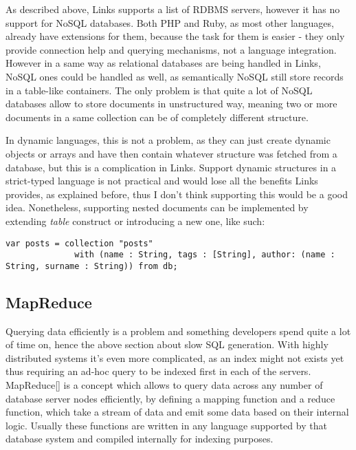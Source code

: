 As described above, Links supports a list of RDBMS servers, however it has no support for NoSQL databases. Both PHP and Ruby, as most other languages, already have extensions for them, because the task for them is easier - they only provide connection help and querying mechanisms, not a language integration. However in a same way as relational databases are being handled in Links, NoSQL ones could be handled as well, as semantically NoSQL still store records in a table-like containers. The only problem is that quite a lot of NoSQL databases allow to store documents in unstructured way, meaning two or more documents in a same collection can be of completely different structure. 

In dynamic languages, this is not a problem, as they can just create dynamic objects or arrays and have then contain whatever structure was fetched from a database, but this is a complication in Links. Support dynamic structures in a strict-typed language is not practical and would lose all the benefits Links provides, as explained before, thus I don't think supporting this would be a good idea. Nonetheless, supporting nested documents can be implemented by extending \textit{table} construct or introducing a new one, like such:

\begin{codelisting}
\begin{verbatim}
var posts = collection "posts" 
			  with (name : String, tags : [String], author: (name : String, surname : String)) from db;
\end{verbatim}
\end{codelisting}

\subsection{MapReduce}

Querying data efficiently is a problem and something developers spend quite a lot of time on, hence the above section about slow SQL generation. With highly distributed systems it's even more complicated, as an index might not exists yet thus requiring an ad-hoc query to be indexed first in each of the servers. MapReduce[] is a concept which allows to query data across any number of database server nodes efficiently, by defining a mapping function and a reduce function, which take a stream of data and emit some data based on their internal logic. Usually these functions are written in any language supported by that database system and compiled internally for indexing purposes.

